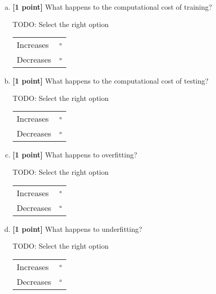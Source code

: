 

\begin{enumerate}[(a)]
    \item \textbf{[1 point]}
What happens to the computational cost of training?
    \begin{mdframed}
    TODO: Select the right option
    
\begin{tabular}[h]{lr}
\toprule
Increases & $\square$ \\
Decreases & $\square$ \\
\bottomrule
\end{tabular}
    \end{mdframed}
    
    \item \textbf{[1 point]}
What happens to the computational cost of testing?
    \begin{mdframed}
    TODO: Select the right option
    
\begin{tabular}[h]{lr}
\toprule
Increases & $\square$ \\
Decreases & $\square$ \\
\bottomrule
\end{tabular}
    \end{mdframed}

    \item \textbf{[1 point]}
    What happens to overfitting?
    \begin{mdframed}
    TODO: Select the right option

\begin{tabular}[h]{lr}
\toprule
Increases & $\square$ \\
Decreases & $\square$ \\
\bottomrule
\end{tabular}
    \end{mdframed}

    \item \textbf{[1 point]}
    What happens to underfitting?
    \begin{mdframed}
    TODO: Select the right option

\begin{tabular}[h]{lr}
\toprule
Increases & $\square$ \\
Decreases & $\square$ \\
\bottomrule
\end{tabular}
    \end{mdframed}
    

\end{enumerate}

